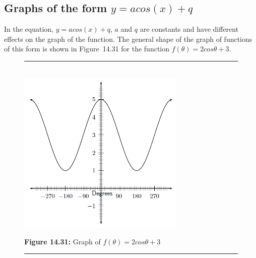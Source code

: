 \subsection*{Graphs of the form $y=acos(x)+q$}
\nopagebreak
In the equation, $y=acos(x)+q$, $a$ and $q$ are constants and have different effects on the graph of the function. The general shape of the graph of functions of this form is shown in Figure~14.31 for the function $f(\theta )=2cos\theta +3$.\par 
\setcounter{subfigure}{0}
\begin{figure}[H] %
\begin{center}
\rule[.1in]{\figurerulewidth}{.005in} \\
\label{m39414*uid52!!!underscore!!!media}\label{m39414*uid52!!!underscore!!!printimage}\includegraphics[width=300px]{col11306.imgs/m39414_trigrep1.png} %
\vspace{2pt}
\vspace{\rubberspace}\par \begin{cnxcaption}
\small \textbf{Figure 14.31: }Graph of $f(\theta )=2cos\theta +3$
\end{cnxcaption}
\vspace{.1in}
\rule[.1in]{\figurerulewidth}{.005in} \\
\end{center}
\end{figure}       

